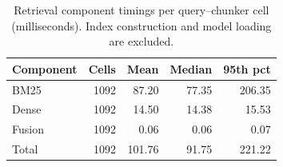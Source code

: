 \begin{table}[htbp]\centering\small
\caption{Retrieval component timings per query--chunker cell (milliseconds). Index construction and model loading are excluded.}\label{tab:retrievalcost}
\begin{tabular}{lrrrr}\toprule
Component & Cells & Mean & Median & 95th pct\\\midrule
BM25 & 1092 & 87.20 & 77.35 & 206.35\\
Dense & 1092 & 14.50 & 14.38 & 15.53\\
Fusion & 1092 & 0.06 & 0.06 & 0.07\\
Total & 1092 & 101.76 & 91.75 & 221.22\\
\bottomrule\end{tabular}\end{table}
